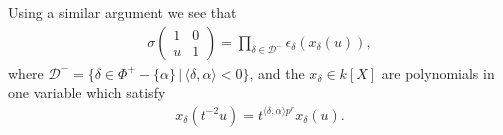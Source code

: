 \begin{remark} \label{claim1'}
Using a similar argument we see that
\begin{align*}
	\sigma\left(\begin{matrix}1 & 0\\u & 1\end{matrix}\right) = \prod_{\delta \in \mathcal{D}^-} \epsilon_\delta\left(x_\delta(u)\right),
\end{align*}
where $\mathcal{D}^- = \{\delta \in \Phi^+ - \{\alpha\}\,|\,\langle\delta,\alpha\rangle < 0\}$, and the $x_\delta \in k[X]$ are polynomials in one variable which satisfy
\begin{align*}
	x_\delta(t^{-2}u) = t^{\langle\delta,\alpha\rangle p^r}x_\delta(u).
\end{align*}
\end{remark}

